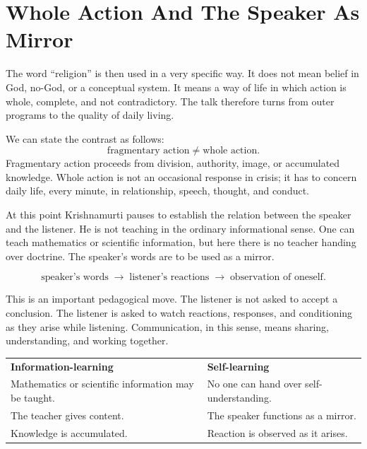 \section{Whole Action And The Speaker As Mirror}

The word ``religion'' is then used in a very specific way. It does not mean belief in God, no-God, or a conceptual system. It means a way of life in which action is whole, complete, and not contradictory. The talk therefore turns from outer programs to the quality of daily living.

We can state the contrast as follows:
\begin{equation}
\text{fragmentary action}
\neq
\text{whole action}.
\end{equation}
Fragmentary action proceeds from division, authority, image, or accumulated knowledge. Whole action is not an occasional response in crisis; it has to concern daily life, every minute, in relationship, speech, thought, and conduct.

At this point Krishnamurti pauses to establish the relation between the speaker and the listener. He is not teaching in the ordinary informational sense. One can teach mathematics or scientific information, but here there is no teacher handing over doctrine. The speaker's words are to be used as a mirror.

\begin{equation}
\text{speaker's words}
\;\longrightarrow\;
\text{listener's reactions}
\;\longrightarrow\;
\text{observation of oneself}.
\end{equation}

This is an important pedagogical move. The listener is not asked to accept a conclusion. The listener is asked to watch reactions, responses, and conditioning as they arise while listening. Communication, in this sense, means sharing, understanding, and working together.

\begin{table}
\centering
\begin{tabular}{p{.42\linewidth}p{.42\linewidth}}
\textbf{Information-learning} & \textbf{Self-learning} \\
Mathematics or scientific information may be taught. & No one can hand over self-understanding. \\
The teacher gives content. & The speaker functions as a mirror. \\
Knowledge is accumulated. & Reaction is observed as it arises. \\
\end{tabular}
\end{table}

